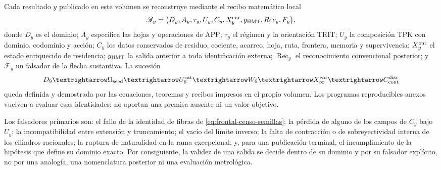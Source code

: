 \begin{proposition}
\label{prop:frontal-autosuficiencia-probatoria}
Cada resultado \(y\) publicado en este volumen se reconstruye mediante el
recibo matemático local
\[
 \mathscr R_y=
 \bigl(D_y,A_y,\tau_y,U_y,C_y,X_y^{\rm enr},
       y_{\rm HMT},\operatorname{Rec}_y,\mathcal F_y\bigr),
\]
donde \(D_y\) es el dominio; \(A_y\) especifica las hojas y operaciones de
APP; \(\tau_y\) el régimen y la orientación TRIT; \(U_y\) la composición TPK
con dominio, codominio y acción; \(C_y\) los datos conservados de residuo,
cociente, acarreo, hoja, ruta, frontera, memoria y supervivencia;
\(X_y^{\rm enr}\) el estado enriquecido de residencia; \(y_{\rm HMT}\) la
salida anterior a toda identificación externa; \(\operatorname{Rec}_y\) el
reconocimiento convencional posterior; y \(\mathcal F_y\) un falsador de la
flecha sustantiva. La sucesión
\[
 \mathcal D_9\longrightarrow\Omega_{\rm seed}
 \longrightarrow\mathcal U_6^{\rm cat}
 \longrightarrow\mathcal W_6
 \longrightarrow X_\infty^{\rm enr}
 \longrightarrow\mathcal C_{\rm cont}^{\rm disc}
\]
queda definida y demostrada por las ecuaciones, teoremas y recibos impresos
en el propio volumen. Los programas reproducibles anexos vuelven a evaluar
esas identidades; no aportan una premisa ausente ni un valor objetivo.

Los falsadores primarios son: el fallo de la identidad de fibras de
\eqref{eq:frontal-censo-semillas}; la pérdida de alguno de los campos de
\(C_y\) bajo \(U_y\); la incompatibilidad entre extensión y truncamiento; el
vacío del límite inverso; la falta de contracción o de sobreyectividad interna
de los cilindros racionales; la ruptura de naturalidad en la rama
excepcional; y, para una publicación terminal, el incumplimiento de la
hipótesis que define su dominio exacto. Por consiguiente, la validez de una
salida se decide dentro de su dominio y por su falsador explícito, no por una
analogía, una nomenclatura posterior ni una evaluación metrológica.
\end{proposition}

